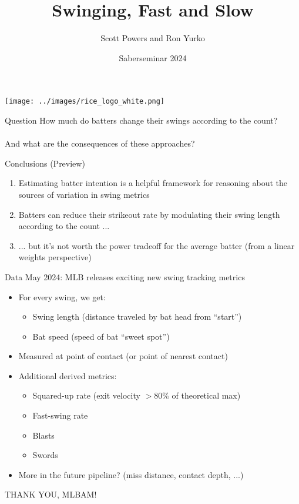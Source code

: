 \documentclass{beamer}
\title{Swinging, Fast and Slow}
\author{Scott Powers\inst{1} and Ron Yurko\inst{2}}
\date{Saberseminar 2024}
\institute{
  \inst{1} Department of Sport Management, Rice University \and
  \inst{2} Department of Statistics \& Data Science, Carnegie Mellon University
}
\begin{document}
\begin{frame}
    \maketitle
    \vfill\hfill\texttt{[image: ../images/rice\_logo\_white.png]}
\end{frame}

\begin{frame}{Question}
  How much do batters change their swings according to the count?\\
  ~\\
  And what are the consequences of these approaches?
\end{frame}

\begin{frame}{Conclusions (Preview)}
  \begin{enumerate}
    \item Estimating batter \alert{intention} is a helpful framework for reasoning about the sources of variation in swing metrics
    \item Batters can reduce their strikeout rate by modulating their swing length according to the count ...
    \item ... but it's not worth the power tradeoff for the average batter (from a linear weights perspective)
  \end{enumerate}
\end{frame}

\begin{frame}{Data}
  May 2024: MLB releases exciting new swing tracking metrics
  \begin{itemize}
    \item For every swing, we get:
    \begin{itemize}
      \item Swing length (distance traveled by bat head from ``start'')
      \item Bat speed (speed of bat ``sweet spot'')
    \end{itemize}
    \item Measured at point of contact (or point of nearest contact)
    \item Additional derived metrics:
    \begin{itemize}
      \item Squared-up rate (exit velocity $> 80\%$ of theoretical max)
      \item Fast-swing rate
      \item Blasts
      \item Swords
    \end{itemize}
    \item More in the future pipeline? (miss distance, contact depth, ...)
  \end{itemize}
  \begin{center}
    \alert{THANK YOU, MLBAM!}
  \end{center}
\end{frame}
\end{document}
